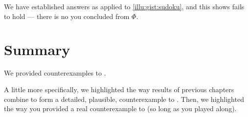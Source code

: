 \begin{note}
  We have established \fingfb{\sudokuRPV{}}{\(\Phi\)} answers \qWhy{} as applied to \autoref{illu:gist:sudoku}, and this \fingfr{} shows \issueInclusion{} fails to hold --- there is no  you concluded \sudokuRPV{} from \(\Phi\).
\end{note}



\section*{Summary}
\label{sec:summary-1}

\begin{note}
  We provided counterexamples to \issueInclusion{}.

  A little more specifically, we highlighted the way results of previous chapters combine to form a detailed, plausible, counterexample to \issueInclusion{}.
  Then, we highlighted the way you provided a real counterexample to \issueInclusion{} (so long as you played along).
\end{note}



